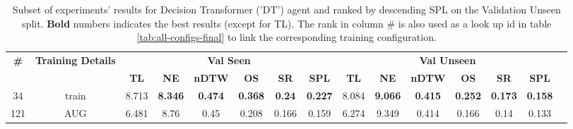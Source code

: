 \begin{table}
\centering
\caption{\label{tab:dt_env_drop}Subset of experiments' results for Decision Transformer ('DT') agent and ranked by descending SPL on the Validation Unseen split. \textbf{Bold} numbers indicates the best results (except for TL). The rank in column \# is also used as a look up id in table \ref{tab:all-configs-final} to link the corresponding training configuration.}
\begin{tabular}{@{\hskip3pt}c@{\hskip3pt}c@{\hskip3pt}c@{\hskip3pt}c@{\hskip3pt}c@{\hskip3pt}c@{\hskip3pt}c@{\hskip3pt}c@{\hskip3pt}c@{\hskip3pt}c@{\hskip3pt}c@{\hskip3pt}c@{\hskip3pt}c@{\hskip3pt}c@{\hskip3pt}c}
\toprule
                                  \textbf{\#} & \textbf{Training Details} & \multicolumn{6}{c}{\textbf{Val Seen}} & \multicolumn{6}{c}{\textbf{Val Unseen}} \\
\cmidrule(l){3-8}\cmidrule(l){9-14}\textbf{~} &                \textbf{~} &       \textbf{TL} &     \textbf{NE} &   \textbf{nDTW} &     \textbf{OS} &    \textbf{SR} &    \textbf{SPL} &         \textbf{TL} &     \textbf{NE} &   \textbf{nDTW} &     \textbf{OS} &     \textbf{SR} &    \textbf{SPL} \\
\midrule
                                           34 &                     train &             8.713 &  \textbf{8.346} &  \textbf{0.474} &  \textbf{0.368} &  \textbf{0.24} &  \textbf{0.227} &               8.084 &  \textbf{9.066} &  \textbf{0.415} &  \textbf{0.252} &  \textbf{0.173} &  \textbf{0.158} \\
                                          121 &                       AUG &             6.481 &            8.76 &            0.45 &           0.208 &          0.166 &           0.159 &               6.274 &           9.349 &           0.414 &           0.166 &            0.14 &           0.133 \\
\bottomrule
\end{tabular}
\end{table}
